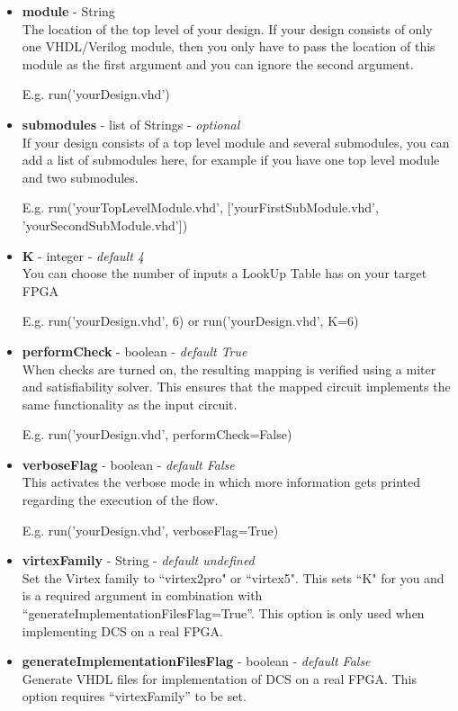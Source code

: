 \documentclass[a4paper,oneside]{memoir}
\begin{document}
\begin{itemize}
\item \textbf{module} - String\\
The location of the top level of your design. If your design consists of only one VHDL/Verilog module, then you only have to pass the location of this module as the first argument and you can ignore the second argument.

E.g. run('yourDesign.vhd')

\item \textbf{submodules} - list of Strings - \textit{optional}\\
If your design consists of a top level module and several submodules, you can add a list of submodules here, for example if you have one top level module and two submodules.

E.g. run('yourTopLevelModule.vhd', ['yourFirstSubModule.vhd', 'yourSecondSubModule.vhd'])

\item \textbf{K} - integer - \textit{default 4}\\
You can choose the number of inputs a LookUp Table has on your target FPGA

E.g. run('yourDesign.vhd', 6)
or run('yourDesign.vhd', K=6)

\item \textbf{performCheck} - boolean - \textit{default True}\\
When checks are turned on, the resulting mapping is verified using a miter and satisfiability solver. This ensures that the mapped circuit implements the same functionality as the input circuit.

E.g. run('yourDesign.vhd', performCheck=False)

\item \textbf{verboseFlag} - boolean - \textit{default False}\\
This activates the verbose mode in which more information gets printed regarding the execution of the flow.

E.g. run('yourDesign.vhd', verboseFlag=True)

\item \textbf{virtexFamily} - String - \textit{default undefined}\\
Set the Virtex family to ``virtex2pro" or ``virtex5". This sets ``K" for you and is a required argument in combination with ``generateImplementationFilesFlag=True''. This option is only used when implementing DCS on a real FPGA.

\item \textbf{generateImplementationFilesFlag} - boolean - \textit{default False}\\
Generate VHDL files for implementation of DCS on a real FPGA. This option requires ``virtexFamily'' to be set.
\end{itemize}
\end{document}
